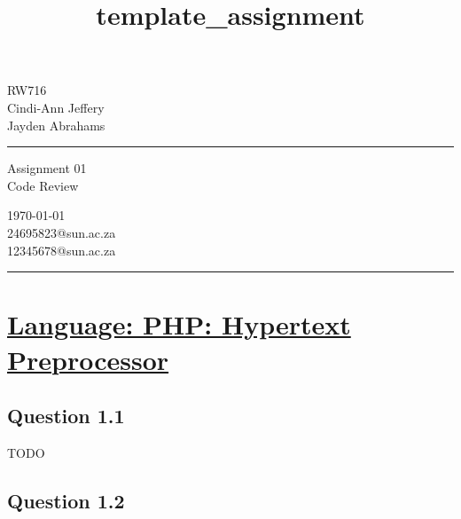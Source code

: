 \documentclass[a4paper,10pt]{article} %
\begin{document}

\title{template_assignment} %
\fancyhead[C]{}
\begin{minipage}{0.295\textwidth} %
\raggedright
RW716\\ %
\footnotesize %
Cindi-Ann Jeffery\\ %
Jayden Abrahams
\medskip\hrule
\end{minipage}
\begin{minipage}{0.4\textwidth} %
\centering 
\large %
Assignment 01\\ %
\normalsize %
Code Review\\ %
\end{minipage}
\begin{minipage}{0.295\textwidth} %
\raggedleft
\today\\ %
\footnotesize %
24695823@sun.ac.za\\
12345678@sun.ac.za%
\medskip\hrule
\end{minipage}



\section*{\underline{Language: PHP: Hypertext Preprocessor}}

\subsection*{\textbf{Question 1.1}}
    TODO
\subsection*{\textbf{Question 1.2}}
\end{document}

